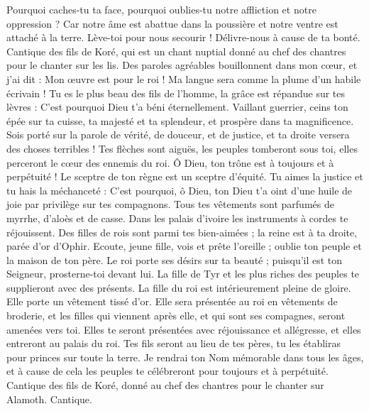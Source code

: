 \begin{multicols}{2}
Pourquoi caches-tu ta face, pourquoi oublies-tu notre affliction et notre oppression ?
Car notre âme est abattue dans la poussière et notre ventre est attaché à la terre.
Lève-toi pour nous secourir ! Délivre-nous à cause de ta bonté.
\VerseOne{}Cantique des fils de Koré, qui est un chant nuptial donné au chef des chantres pour le chanter sur les lis.
Des paroles agréables bouillonnent dans mon cœur, et j'ai dit : Mon œuvre est pour le roi ! Ma langue sera comme la plume d'un habile écrivain !
Tu es le plus beau des fils de l’homme, la grâce est répandue sur tes lèvres : C’est pourquoi Dieu t'a béni éternellement.
Vaillant guerrier, ceins ton épée sur ta cuisse, ta majesté et ta splendeur,
et prospère dans ta magnificence. Sois porté sur la parole de vérité, de douceur, et de justice, et ta droite versera des choses terribles !
Tes flèches sont aiguës, les peuples tomberont sous toi, elles perceront le cœur des ennemis du roi.
Ô Dieu, ton trône est à toujours et à perpétuité ! Le sceptre de ton règne est un sceptre d'équité.
Tu aimes la justice et tu hais la méchanceté : C'est pourquoi, ô Dieu, ton Dieu t'a oint d'une huile de joie par privilège sur tes compagnons.
Tous tes vêtements sont parfumés de myrrhe, d’aloès et de casse. Dans les palais d'ivoire les instruments à cordes te réjouissent.
Des filles de rois sont parmi tes bien-aimées ; la reine est à ta droite, parée d'or d'Ophir.
Ecoute, jeune fille, vois et prête l'oreille ; oublie ton peuple et la maison de ton père.
Le roi porte ses désirs sur ta beauté ; puisqu'il est ton Seigneur, prosterne-toi devant lui.
La fille de Tyr et les plus riches des peuples te supplieront avec des présents.
La fille du roi est intérieurement pleine de gloire. Elle porte un vêtement tissé d'or.
Elle sera présentée au roi en vêtements de broderie, et les filles qui viennent après elle, et qui sont ses compagnes, seront amenées vers toi.
Elles te seront présentées avec réjouissance et allégresse, et elles entreront au palais du roi.
Tes fils seront au lieu de tes pères, tu les établiras pour princes sur toute la terre.
Je rendrai ton Nom mémorable dans tous les âges, et à cause de cela les peuples te célébreront pour toujours et à perpétuité.
\VerseOne{}Cantique des fils de Koré, donné au chef des chantres pour le chanter sur Alamoth. Cantique.

\end{multicols}
